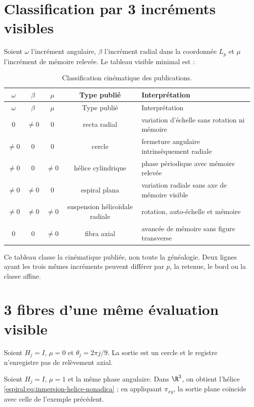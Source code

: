 \section{Classification par 3 incréments visibles}

Soient \(\omega\) l'incrément angulaire, \(\beta\) l'incrément radial dans la coordonnée \(L_p\) et \(\mu\) l'incrément de mémoire relevée. Le tableau visible minimal est :
\begin{longtable}{ccccp{}}
\caption{Classification cinématique des publications.}
\label{espiral:tab:clasificacion-cinematica}\\
\toprule
\(\omega\)&\(\beta\)&\(\mu\)&Type publié&Interprétation\\
\midrule
\endfirsthead
\toprule
\(\omega\)&\(\beta\)&\(\mu\)&Type publié&Interprétation\\
\midrule
\endhead
0&\(\neq0\)&0&recta radial&variation d'échelle sans rotation ni mémoire\\
\(\neq0\)&0&0&cercle&fermeture angulaire intrinsèquement radiale\\
\(\neq0\)&0&\(\neq0\)&hélice cylindrique&phase périodique avec mémoire relevée\\
\(\neq0\)&\(\neq0\)&0&espiral plana&variation radiale sans axe de mémoire visible\\
\(\neq0\)&\(\neq0\)&\(\neq0\)&suspension hélicoïdale radiale&rotation, auto-échelle et mémoire\\
0&0&\(\neq0\)&fibra axial&avancée de mémoire sans figure transverse\\
\bottomrule
\end{longtable}

Ce tableau classe la cinématique publiée, non toute la généalogie. Deux lignes ayant les trois mêmes incréments peuvent différer par \(p\), la retenue, le bord ou la classe affine.

\section{3 fibres d'une même évaluation visible}

\begin{example}
Soient \(H_j=I\), \(\mu=0\) et \(\theta_j=2\pi j/9\). La sortie est un cercle et le registre n'enregistre pas de relèvement axial.
\end{example}

\begin{example}
Soient \(H_j=I\), \(\mu=1\) et la même phase angulaire. Dans \(\R^3\), on obtient l'hélice \cref{espiral:eq:inmersion-helice-nonadica} ; en appliquant \(\pi_{xy}\), la sortie plane coïncide avec celle de l'exemple précédent.
\end{example}

